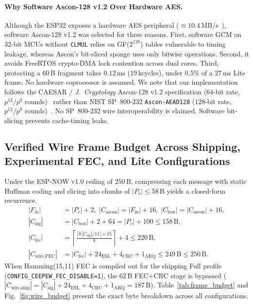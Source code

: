 \documentclass[conference]{IEEEtran}
\begin{document}
\paragraph{Why Software Ascon-128 v1.2 Over Hardware AES.} Although the ESP32 exposes a hardware AES peripheral ($\approx 10.4$\,MB/s~\cite{oryx_esp32}), software Ascon-128 v1.2 was selected for three reasons. First, software GCM on 32-bit MCUs without \texttt{CLMUL} relies on GF($2^{128}$) tables vulnerable to timing leakage, whereas Ascon's bit-sliced sponge uses only bitwise operations. Second, it avoids FreeRTOS crypto-DMA lock contention across dual cores. Third, protecting a $60$\,B fragment takes $0.12$\,ms ($19$\,kcycles), under $0.5\%$ of a $27$\,ms Lite frame. No hardware coprocessor is assumed. We note that our implementation follows the CAESAR / \textit{J.\ Cryptology} Ascon-128 v1.2 specification ($64$-bit rate, $p^{12}/p^{6}$ rounds)~\cite{dobraunig2021} rather than NIST SP~800-232 \texttt{Ascon-AEAD128} ($128$-bit rate, $p^{12}/p^{8}$ rounds)~\cite{nist_ascon2025}. No SP~800-232 wire interoperability is claimed. Software bit-slicing prevents cache-timing leaks.

\subsection{Verified Wire Frame Budget Across Shipping, Experimental FEC, and Lite Configurations}
Under the ESP-NOW v1.0 ceiling of $250$\,B, compressing each message with static Huffman coding and slicing into chunks of $|P_c| \le 58$\,B yields a closed-form recurrence.
\begin{align}
|F_{\text{in}}| &= |P_c| + 2, \; |C_{\text{ascon}}| = |F_{\text{in}}| + 16, \; |C_{\text{box}}| = |C_{\text{ascon}}| + 16, \label{eq:box}\\
|C_{\text{sig}}| &= |C_{\text{box}}| + 2 + 64 = |P_c| + 100 \le 158\,\text{B}, \label{eq:sig}\\
|C_{\text{fec}}| &= \left\lceil \frac{\lceil 8\,|C_{\text{sig}}| / 11 \rceil \times 15}{8} \right\rceil + 4 \le 220\,\text{B}, \label{eq:fec}\\
|C_{\text{wire,FEC}}| &= |C_{\text{fec}}| + 24_{\text{ESL}} + 4_{\text{CRC}} + 1_{\text{ARQ}} \le 249\,\text{B} \le 250\,\text{B}. \label{eq:wire}
\end{align}
When Hamming(15,11) FEC is compiled out for the shipping Full profile (\texttt{CONFIG\_CEEPEW\_FEC\_DISABLE=1}), the $62$\,B FEC+CRC stage is bypassed ($|C_{\text{wire,ship}}| = |C_{\text{sig}}| + 24_{\text{ESL}} + 4_{\text{CRC}} + 1_{\text{ARQ}} = 187$\,B). Table~\ref{tab:frame_budget} and Fig.~\ref{fig:wire_budget} present the exact byte breakdown across all configurations.
\end{document}
